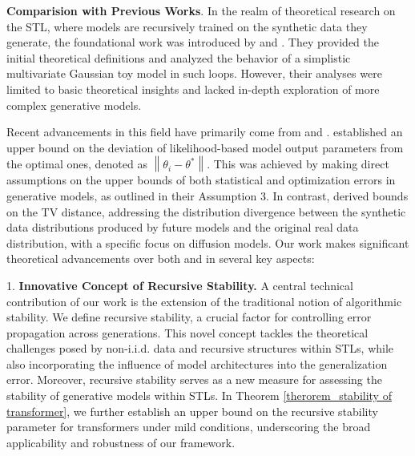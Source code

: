 \begin{remark} \textbf{Comparision with Previous Works}.
In the realm of theoretical research on the STL, where models are recursively trained on the synthetic data they generate, the foundational work was introduced by \cite{shumailov2024ai} and \cite{alemohammadself}. They provided the initial theoretical definitions and analyzed the behavior of a simplistic multivariate Gaussian toy model in such loops. However, their analyses were limited to basic theoretical insights and lacked in-depth exploration of more complex generative models.

Recent advancements in this field have primarily come from \cite{bertrandstability} and \cite{futowards}. \cite{bertrandstability} established an upper bound on the deviation of likelihood-based model output parameters from the optimal ones, denoted as $\left\|\theta_{i}-\theta^*\right\|$. This was achieved by making direct assumptions on the upper bounds of both statistical and optimization errors in generative models, as outlined in their Assumption 3. In contrast, \cite{futowards} derived bounds on the TV distance, addressing the distribution divergence between the synthetic data distributions produced by future models and the original real data distribution, with a specific focus on diffusion models. Our work makes significant theoretical advancements over both \cite{bertrandstability} and  \cite{futowards} in several key aspects:

1. \textbf{Innovative Concept of Recursive Stability.} A central technical contribution of our work is the extension of the traditional notion of algorithmic stability. We define recursive stability, a crucial factor for controlling error propagation across generations. This novel concept tackles the theoretical challenges posed by non-i.i.d. data and recursive structures within STLs, while also incorporating the influence of model architectures into the generalization error. Moreover, recursive stability serves as a new measure for assessing the stability of generative models within STLs. In Theorem \ref{therorem_stability of transformer}, we further establish an upper bound on the recursive stability parameter for transformers under mild conditions, underscoring the broad applicability and robustness of our framework.


\end{remark}

